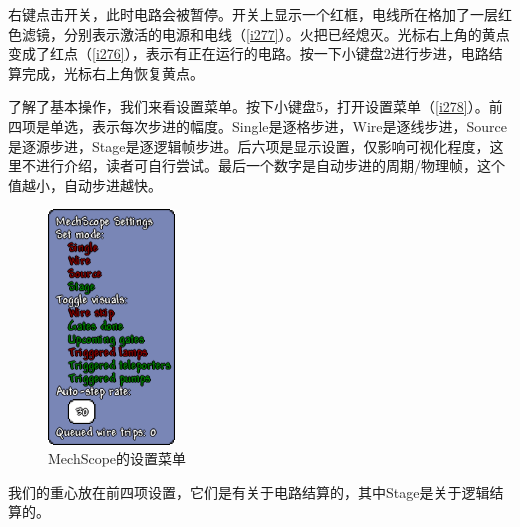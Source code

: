 右键点击开关，此时电路会被暂停。开关上显示一个红框，电线所在格加了一层红色滤镜，分别表示激活的电源和电线（\autoref{i277}）。火把已经熄灭。光标右上角的黄点变成了红点（\autoref{i276}），表示有正在运行的电路。按一下小键盘2进行步进，电路结算完成，光标右上角恢复黄点。

了解了基本操作，我们来看设置菜单。按下小键盘5，打开设置菜单（\autoref{i278}）。前四项是单选，表示每次步进的幅度。Single是逐格步进，Wire是逐线步进，Source是逐源步进，Stage是逐逻辑帧步进。后六项是显示设置，仅影响可视化程度，这里不进行介绍，读者可自行尝试。最后一个数字是自动步进的周期/物理帧，这个值越小，自动步进越快。
\begin{figure}
\centering
\includegraphics[width=0.3\textwidth]{images/278.png}
\caption{MechScope的设置菜单}\label{i278}
\end{figure}

我们的重心放在前四项设置，它们是有关于电路结算的，其中Stage是关于逻辑结算的。

